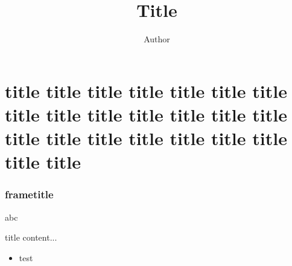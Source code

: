 \documentclass{beamer}
\author{Author}
\title{Title}
\institute{Institute}
\begin{document}
\begin{frame}
\titlepage
\end{frame}

\section{title title title title title title title title title title title title title title title title title title title title title title title }

\begin{frame}
  \frametitle{frametitle}
  abc
  \begin{block}{title}
  content...
  \end{block}
  
  \begin{itemize}
  \item test
  \end{itemize}
\end{frame}
\end{document}
